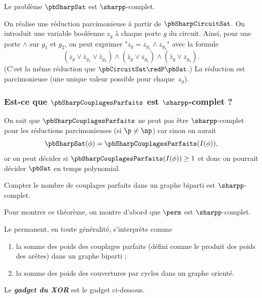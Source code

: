 \documentclass[./main]{subfiles}
\begin{document}
  \begin{thm}
    Le problème $\pbSharpSat$ est $\sharpp$-complet.
  \end{thm}
  \begin{prv}
    On réalise une réduction parcimonieuse à partir de $\pbSharpCircuitSat$.
    On introduit une variable booléenne  $z_g$ à chaque porte $g$ du circuit.
    Ainsi, pour une porte $\wedge$ sur $g_1$ et $g_2$, on peut exprimer "$z_g = z_{g_1} \wedge z_{g_2}$" avec la formule
    \[
      (z_g \vee \bar{z}_{g_1} \vee \bar{z}_{g_2}) \wedge (\bar{z}_g \vee z_{g_1}) \wedge (\bar{z}_g \vee z_{g_2})
    .\]
    (C'est la même réduction que $\pbCircuitSat \redP \pbSat$.)
    La réduction est parcimonieuse (une unique valeur possible pour chaque~$z_g$).
  \end{prv}

  \subsubsection{Est-ce que $\pbSharpCouplagesParfaits$ est $\sharpp$-complet ?}

  On sait que $\pbSharpCouplagesParfaits$ ne peut pas être  $\sharpp$-complet pour les réductions parcimonieuses (si $\p \neq \np$) car sinon on aurait
  \[
  \pbSharpSat(\phi) = \pbSharpCouplagesParfaits(I(\phi))
  ,\]
  or on peut décider si $\pbSharpCouplagesParfaits(I(\phi)) \ge 1$ et donc on pourrait décider $\pbSat$ en temps polynomial.

  \begin{thm}[Valiant]
    Compter le nombre de couplages parfaits dans un graphe biparti est $\sharpp$-complet.
  \end{thm}

  Pour montrer ce théorème, on montre d'abord que $\perm$ est $\sharpp$-complet.

  Le permanent, en toute généralité, s'interprète comme
  \begin{enumerate}
    \item la somme des poids des couplages parfaits (défini comme le produit des poids des arêtes) dans un graphe biparti ;
    \item la somme des poids des couvertures par cycles dans un graphe orienté.
  \end{enumerate}

  Le \textit{\textbf{gadget du XOR}} est le gadget ci-dessous.
\end{document}
